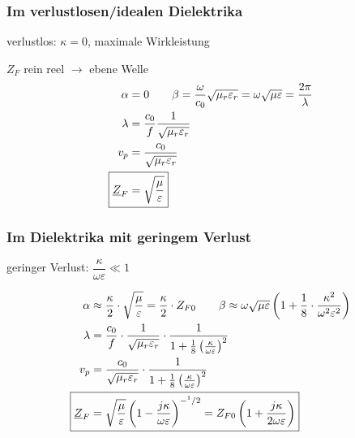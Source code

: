 \subsubsection{Im verlustlosen/idealen Dielektrika}
verlustlos: $\kappa =0$, maximale Wirkleistung

$Z_F$ rein reel $\rightarrow$ ebene Welle
\begin{align*}
    \alpha                  & = 0  \qquad \beta = \dfrac{\omega}{c_0}\sqrt{\mu_r\varepsilon_r}=\omega\sqrt{\mu\varepsilon}=\dfrac{2\pi}{\lambda} \\
    \lambda                 & = \dfrac{c_0}{f}\dfrac{1}{\sqrt{\mu_r\varepsilon_r}}                                             \\
    v_p                     & = \dfrac{c_0}{\sqrt{\mu_r\varepsilon_r}}                                                         \\
    \Aboxed{\underline{Z}_F & = \sqrt{\dfrac{\mu}{\varepsilon}}}
\end{align*}

\subsubsection{Im Dielektrika mit geringem Verlust}
geringer Verlust: $\dfrac{\kappa}{\omega\varepsilon} \ll 1$

\begin{align*}
    \alpha                  & \approx\dfrac{\kappa}{2}\cdot\sqrt{\dfrac{\mu}{\varepsilon}} = \frac{\kappa}{2}\cdot Z_{F0}  \qquad \beta \approx\omega\sqrt{\mu\varepsilon}\left(1+\dfrac{1}{8}\cdot\dfrac{\kappa^2}{\omega^2\varepsilon^2}\right) \\
    \lambda                 & = \dfrac{c_0}{f}\cdot\dfrac{1}{\sqrt{\mu_r\varepsilon_r}}\cdot\frac{1}{1+\frac{1}{8}\left(\frac{\kappa}{\omega\varepsilon}\right)^2}                       \\
    v_p                     & = \dfrac{c_0}{\sqrt{\mu_r\varepsilon_r}}\cdot\frac{1}{1+\frac{1}{8}\left(\frac{\kappa}{\omega\varepsilon}\right)^2}                                        \\
    \Aboxed{\underline{Z}_F & = \sqrt{\dfrac{\mu}{\varepsilon}}\left(1-\frac{j\kappa}{\omega\varepsilon}\right)^{-^1/2} = Z_{F0}\left(1+\frac{j\kappa}{2\omega\varepsilon}\right)}
\end{align*}

